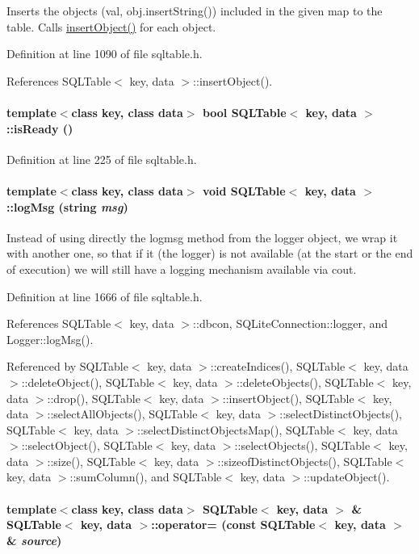 Inserts the objects (val, obj.insert\-String()) included in the given map to the table. Calls \hyperlink{classSQLTable_SQLTablea18}{insert\-Object()} for each object. 

Definition at line 1090 of file sqltable.h.

References SQLTable$<$ key, data $>$::insert\-Object().\hypertarget{classSQLTable_SQLTablea38}{
\paragraph[isReady]{\setlength{\rightskip}{0pt plus 5cm}template$<$class key, class data$>$ bool SQLTable$<$ key, data $>$::is\-Ready ()}\hfill}
\label{classSQLTable_SQLTablea38}




Definition at line 225 of file sqltable.h.\hypertarget{classSQLTable_SQLTablea39}{
\paragraph[logMsg]{\setlength{\rightskip}{0pt plus 5cm}template$<$class key, class data$>$ void SQLTable$<$ key, data $>$::log\-Msg (string {\em msg})}\hfill}
\label{classSQLTable_SQLTablea39}


Instead of using directly the logmsg method from the logger object, we wrap it with another one, so that if it (the logger) is not available (at the start or the end of execution) we will still have a logging mechanism available via cout. 

Definition at line 1666 of file sqltable.h.

References SQLTable$<$ key, data $>$::dbcon, SQLite\-Connection::logger, and Logger::log\-Msg().

Referenced by SQLTable$<$ key, data $>$::create\-Indices(), SQLTable$<$ key, data $>$::delete\-Object(), SQLTable$<$ key, data $>$::delete\-Objects(), SQLTable$<$ key, data $>$::drop(), SQLTable$<$ key, data $>$::insert\-Object(), SQLTable$<$ key, data $>$::select\-All\-Objects(), SQLTable$<$ key, data $>$::select\-Distinct\-Objects(), SQLTable$<$ key, data $>$::select\-Distinct\-Objects\-Map(), SQLTable$<$ key, data $>$::select\-Object(), SQLTable$<$ key, data $>$::select\-Objects(), SQLTable$<$ key, data $>$::size(), SQLTable$<$ key, data $>$::sizeof\-Distinct\-Objects(), SQLTable$<$ key, data $>$::sum\-Column(), and SQLTable$<$ key, data $>$::update\-Object().\hypertarget{classSQLTable_SQLTablea3}{
\paragraph[operator=]{\setlength{\rightskip}{0pt plus 5cm}template$<$class key, class data$>$ SQLTable$<$ key, data $>$ \& SQLTable$<$ key, data $>$::operator= (const SQLTable$<$ key, data $>$ \& {\em source})}\hfill}
\label{classSQLTable_SQLTablea3}


